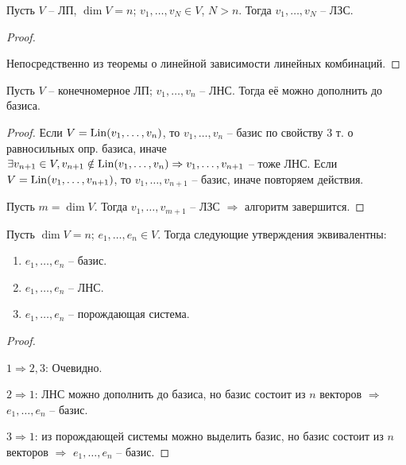 \begin{lemma}
\end{lemma}
Пусть $V$ -- ЛП, $\dim V = n$; $v_1, \dots, v_N \in V$, $N > n$.
Тогда $v_1, \dots, v_N$ -- ЛЗС.
\begin{proof} $ $

    Непосредственно из теоремы о линейной зависимости линейных комбинаций.
\end{proof}

\begin{theorem-non}
\end{theorem-non}
Пусть $V$ -- конечномерное ЛП; $v_1, \dots, v_n$ -- ЛНС. Тогда
её можно дополнить до базиса.
\begin{proof}
    Если $V = \operatorname{Lin}(v_1, \dots, v_n)$, то $v_1, \dots, v_n$ -- базис
    по свойству 3 т. о равносильных опр. базиса, иначе
    $\exists v_{n+1} \in V, v_{n+1} \notin \operatorname{Lin}(v_1, \dots, v_n)
    \Rightarrow v_1, \dots, v_{n+1}$ -- тоже ЛНС.
    Если $V = \operatorname{Lin}(v_1, \dots, v_{n+1})$, то $v_1, \dots, v_{n+1}$
    -- базис, иначе повторяем действия.
    
    Пусть $m = \dim V$. Тогда $v_1, \dots, v_{m + 1}$ -- ЛЗС
    $\Rightarrow$ алгоритм завершится.
\end{proof}

\follow 

Пусть $\dim V = n$; $e_1, \dots, e_n \in V$. Тогда
следующие утверждения эквивалентны:
\begin{enumerate}
    \item $e_1, \dots, e_n$ -- базис.
    \item $e_1, \dots, e_n$ -- ЛНС.
    \item $e_1, \dots, e_n$ -- порождающая система.
\end{enumerate}
\begin{proof} $ $

    $1 \Rightarrow 2, 3$: Очевидно.

    $2 \Rightarrow 1$: ЛНС можно дополнить до базиса, 
    но базис состоит из $n$ векторов $\Rightarrow$ 
    $e_1, \dots, e_n$ -- базис.

    $3 \Rightarrow 1$: из порождающей системы можно выделить базис, 
    но базис состоит из $n$ векторов $\Rightarrow$ 
    $e_1, \dots, e_n$ -- базис.
\end{proof}